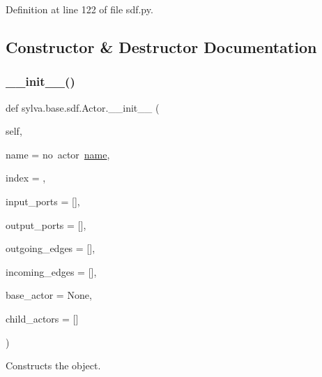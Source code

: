 Definition at line 122 of file sdf.\+py.



\subsection{Constructor \& Destructor Documentation}
\mbox{\label{classsylva_1_1base_1_1sdf_1_1_actor_a4351fa2189135a2c4eee007a715c60f3}} 
\subsubsection{\texorpdfstring{\+\_\+\+\_\+init\+\_\+\+\_\+()}{\_\_init\_\_()}}
{\footnotesize\ttfamily def sylva.\+base.\+sdf.\+Actor.\+\_\+\+\_\+init\+\_\+\+\_\+ (\begin{DoxyParamCaption}\item[{}]{self,  }\item[{}]{name = {\ttfamily \textquotesingle{}no~actor~\hyperlink{classsylva_1_1base_1_1sdf_1_1_actor_a76ca02f41b3d1fae9d3df33f94f2fcdf}{name}\textquotesingle{}},  }\item[{}]{index = {},  }\item[{}]{input\+\_\+ports = {\ttfamily \mbox{[}\mbox{]}},  }\item[{}]{output\+\_\+ports = {\ttfamily \mbox{[}\mbox{]}},  }\item[{}]{outgoing\+\_\+edges = {\ttfamily \mbox{[}\mbox{]}},  }\item[{}]{incoming\+\_\+edges = {\ttfamily \mbox{[}\mbox{]}},  }\item[{}]{base\+\_\+actor = {\ttfamily None},  }\item[{}]{child\+\_\+actors = {\ttfamily \mbox{[}\mbox{]}} }\end{DoxyParamCaption})}



Constructs the object. 


